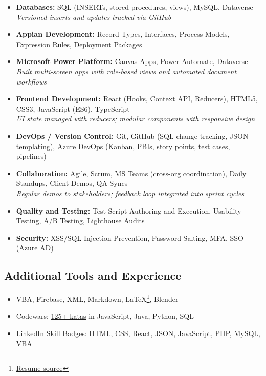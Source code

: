 \documentclass{article}
\begin{document}
\begin{itemize}
  \item \textbf{Databases:} SQL (INSERTs, stored procedures, views), MySQL, Dataverse\\
  \textit{Versioned inserts and updates tracked via GitHub}
  
  \item \textbf{Appian Development:} Record Types, Interfaces, Process Models, Expression Rules, Deployment Packages
  
  \item \textbf{Microsoft Power Platform:} Canvas Apps, Power Automate, Dataverse\\
  \textit{Built multi-screen apps with role-based views and automated document workflows}
  
  \item \textbf{Frontend Development:} React (Hooks, Context API, Reducers), HTML5, CSS3, JavaScript (ES6), TypeScript\\
  \textit{UI state managed with reducers; modular components with responsive design}
  
  \item \textbf{DevOps / Version Control:} Git, GitHub (SQL change tracking, JSON templating), Azure DevOps (Kanban, PBIs, story points, test cases, pipelines)
  
  \item \textbf{Collaboration:} Agile, Scrum, MS Teams (cross-org coordination), Daily Standups, Client Demos, QA Syncs\\
  \textit{Regular demos to stakeholders; feedback loop integrated into sprint cycles}
  
  \item \textbf{Quality and Testing:} Test Script Authoring and Execution, Usability Testing, A/B Testing, Lighthouse Audits

  \item \textbf{Security:} XSS/SQL Injection Prevention, Password Salting, MFA, SSO (Azure AD)
\end{itemize}

\vspace{0.5em}
\subsection*{Additional Tools and Experience}
\begin{itemize}
  \item VBA, Firebase, XML, Markdown, \LaTeX\footnote{\href{https://github.com/sirkoik/CurriculumVitae/blob/master/source/main/resume.tex}{Resume source}}, Blender
  \item Codewars: \href{https://www.codewars.com/users/sirkoik}{125+ katas} in JavaScript, Java, Python, SQL
  \item LinkedIn Skill Badges: HTML, CSS, React, JSON, JavaScript, PHP, MySQL, VBA
\end{itemize}
\end{document}
